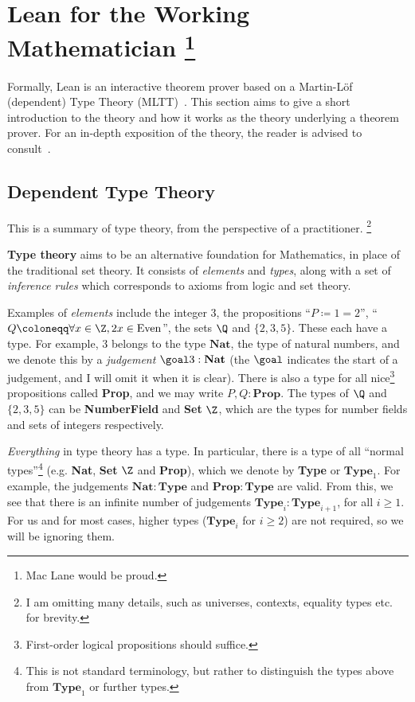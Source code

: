 \section{Lean for the Working Mathematician \protect\footnote{Mac Lane would be proud.}}

Formally, Lean is an interactive theorem prover based on a Martin-Löf (dependent) Type Theory (MLTT)~\cite{MartinLöf1984}. This section aims to give a short introduction to the theory and how it works as the theory underlying a theorem prover. For an in-depth exposition of the theory, the reader is advised to consult~\cite{Rijke2022}.

\subsection{Dependent Type Theory}

This is a summary of type theory, from the perspective of a practitioner. \footnote{I am omitting many details, such as universes, contexts, equality types etc. for brevity.}

\begin{gtheorem*}
  \textbf{Type theory} aims to be an alternative foundation for Mathematics, in place of the traditional set theory. It consists of \textit{elements} and \textit{types}, along with a set of \textit{inference rules} which corresponds to axioms from logic and set theory.
\end{gtheorem*}

Examples of \textit{elements} include the integer \(3\), the propositions ``\(P \coloneqq 1 = 2\)'', ``\(Q \coloneqq \forall x \in \Z, 2x \in \mathrm{Even}\)'', the sets \(\Q\) and \(\{2, 3, 5\}\). These each have a type. For example, \(3\) belongs to the type \(\mathbf{Nat}\), the type of natural numbers, and we denote this by a \textit{judgement} \(\goal 3 : \mathbf{Nat}\) (the \(\goal\) indicates the start of a judgement, and I will omit it when it is clear). There is also a type for all nice\footnote{First-order logical propositions should suffice.} propositions called \textbf{Prop}, and we may write \(P, Q : \mathbf{Prop}\). The types of \(\Q\) and \(\{2, 3, 5\}\) can be \textbf{NumberField} and \textbf{Set} \(\Z\), which are the types for number fields and sets of integers respectively.

\textit{Everything} in type theory has a type. In particular, there is a type of all ``normal types''\footnote{This is not standard terminology, but rather to distinguish the types above from \(\mathbf{Type}_1\) or further types.} (e.g. \textbf{Nat}, \textbf{Set} \(\Z\) and \textbf{Prop}), which we denote by \textbf{Type} or \(\mathbf{Type}_1\). For example, the judgements \(\mathbf{Nat} : \mathbf{Type}\) and \(\mathbf{Prop} : \mathbf{Type}\) are valid. From this, we see that there is an infinite number of judgements \(\mathbf{Type}_i : \mathbf{Type}_{i + 1}\), for all \(i \geq 1\). For us and for most cases, higher types (\(\mathbf{Type}_i\) for \(i \geq 2\)) are not required, so we will be ignoring them.

